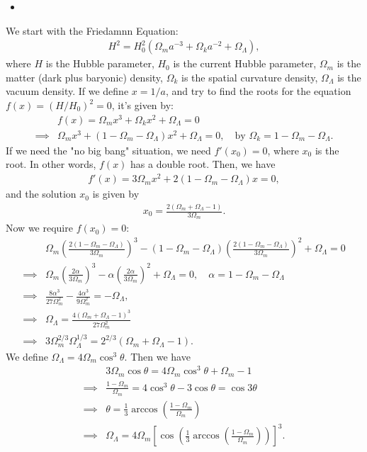\answer{}
\begin{itemize}
    \item [(a)]
\end{itemize}
We start with the Friedamnn Equation:
\begin{align}
    H^2= H_0^2(\Omega_m a^{-3}+\Omega_k a^{-2} +\Omega_\Lambda),
\end{align}
where $H$ is the Hubble parameter, $H_0$ is the current Hubble parameter, $\Omega_m$ is the matter (dark plus baryonic) density, $\Omega_k$ is the spatial curvature density, $\Omega_\Lambda$ is the vacuum density. If we define $x=1/a$, and try to find the roots for the equation $f(x)=(H/H_0)^2=0$, it's given by:
\begin{align}
    &f(x)=\Omega_m x^3 +\Omega_k x^2 + \Omega_\Lambda  =0\\
    \implies& \Omega_m x^3 + (1-\Omega_m-\Omega_\Lambda)x^2 +\Omega_\Lambda=0,\quad\text{by $\Omega_k=1-\Omega_m-\Omega_\Lambda$}.
\end{align}
If we need the "no big bang" situation, we need $f'(x_0)=0$, where $x_0$ is the root. In other words, $f(x)$ has a double root. Then, we have 
\begin{align}
    f'(x) = 3\Omega_m x^2 + 2(1-\Omega_m-\Omega_\Lambda)x = 0,
\end{align}
and the solution $x_0$ is given by 
\begin{align}
    x_0 = \frac{2(\Omega_m + \Omega_\Lambda - 1)}{3\Omega_m}.
\end{align}
Now we require $f(x_0)=0$:
\begin{align}
    &\Omega_m \left( \frac{2(1-\Omega_m-\Omega_\Lambda)}{3\Omega_m} \right)^3 - (1-\Omega_m-\Omega_\Lambda) \left( \frac{2(1-\Omega_m-\Omega_\Lambda)}{3\Omega_m} \right)^2 + \Omega_\Lambda = 0\\
    \implies &\Omega_m \left( \frac{2\alpha}{3\Omega_m} \right)^3 - \alpha \left( \frac{2\alpha}{3\Omega_m} \right)^2 + \Omega_\Lambda = 0,\quad\text{$\alpha=1-\Omega_m-\Omega_\Lambda$}\\
    \implies&\frac{8\alpha^3}{27\Omega_m^2}-\frac{4\alpha^3}{9\Omega_m^2}=-\Omega_\Lambda,\\
    \implies&\Omega_\Lambda=\frac{4(\Omega_m+\Omega_\Lambda-1)^3}{27 \Omega_m^2}\\
    \implies& 3\Omega_m^{2/3}\Omega_\Lambda^{1/3}=2^{2/3}(\Omega_m+\Omega_\Lambda-1).
\end{align}
We define $\Omega_\Lambda=4\Omega_m \cos^3\theta$. Then we have 
\begin{align}
    &3 \Omega_m \cos\theta = 4\Omega_m\cos^3\theta+\Omega_m -1\\
    \implies& \frac{1-\Omega_m}{\Omega_m}= 4\cos^3\theta-3\cos\theta=\cos3\theta\\
    \implies& \theta =\frac{1}{3}\arccos\left(\frac{1-\Omega_m}{\Omega_m}\right)\\
    \implies& \Omega_\Lambda=4 \Omega_m\left[\cos\left(\frac{1}{3}\arccos\left(\frac{1-\Omega_m}{\Omega_m}\right)\right)\right]^3.
\end{align}
